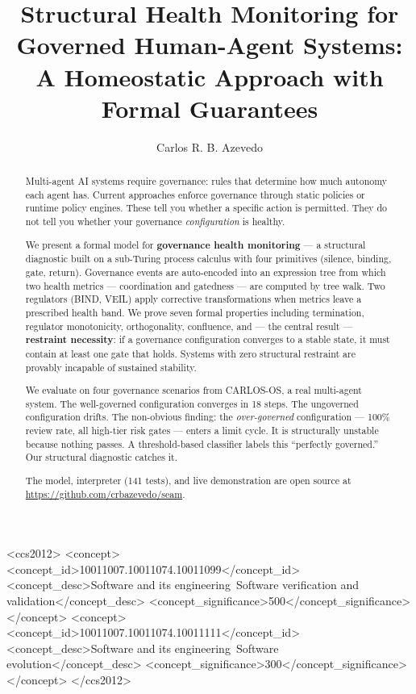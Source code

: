\documentclass[sigconf,nonacm]{acmart}
\begin{document}
\title{Structural Health Monitoring for Governed Human-Agent Systems:\\
A Homeostatic Approach with Formal Guarantees}

\author{Carlos R. B. Azevedo}

\begin{abstract}
Multi-agent AI systems require governance: rules that determine how much
autonomy each agent has. Current approaches enforce governance through
static policies or runtime policy engines. These tell you whether a
specific action is permitted. They do not tell you whether your governance
\emph{configuration} is healthy.

We present a formal model for \textbf{governance health monitoring} ---
a structural diagnostic built on a sub-Turing process calculus with four
primitives (silence, binding, gate, return). Governance events are
auto-encoded into an expression tree from which two health metrics ---
coordination and gatedness --- are computed by tree walk. Two regulators
(BIND, VEIL) apply corrective transformations when metrics leave a
prescribed health band. We prove seven formal properties including
termination, regulator monotonicity, orthogonality, confluence, and ---
the central result --- \textbf{restraint necessity}: if a governance
configuration converges to a stable state, it must contain at least one
gate that holds. Systems with zero structural restraint are provably
incapable of sustained stability.

We evaluate on four governance scenarios from CARLOS-OS, a real
multi-agent system. The well-governed configuration converges in 18
steps. The ungoverned configuration drifts. The non-obvious finding:
the \emph{over-governed} configuration --- 100\% review rate, all
high-tier risk gates --- enters a limit cycle. It is structurally
unstable because nothing passes. A threshold-based classifier labels
this ``perfectly governed.'' Our structural diagnostic catches it.

The model, interpreter (141 tests), and live demonstration are open
source at \url{https://github.com/crbazevedo/seam}.
\end{abstract}

\begin{CCSXML}
<ccs2012>
<concept>
<concept_id>10011007.10011074.10011099</concept_id>
<concept_desc>Software and its engineering~Software verification and validation</concept_desc>
<concept_significance>500</concept_significance>
</concept>
<concept>
<concept_id>10011007.10011074.10011111</concept_id>
<concept_desc>Software and its engineering~Software evolution</concept_desc>
<concept_significance>300</concept_significance>
</concept>
</ccs2012>
\end{CCSXML}
\end{document}
